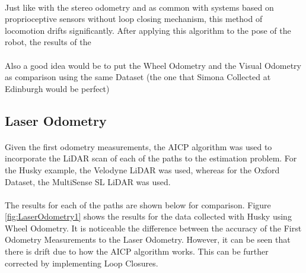 \documentclass[11pt]{article}
\begin{document}
	\paragraph{}
	Just like with the stereo odometry and as common with systems based on proprioceptive sensors without loop closing mechanism, this method of locomotion drifts significantly. After applying this algorithm to the pose of the robot, the results of the 
	\paragraph{}
	Also a good idea would be to put the Wheel Odometry and the Visual Odometry as comparison using the same Dataset (the one that Simona Collected at Edinburgh would be perfect)
		
	\subsection{Laser Odometry}
	\paragraph{}
	Given the first odometry measurements, the AICP algorithm was used to incorporate the LiDAR scan of each of the paths to the estimation problem. For the Husky example, the Velodyne \cite{velodyne} LiDAR was used, whereas for the Oxford Dataset, the MultiSense SL LiDAR was used.
	
	\paragraph{}
	The results for each of the paths are shown below for comparison. Figure \ref{fig:LaserOdometry1} shows the results for the data collected with Husky using Wheel Odometry. It is noticeable the difference between the accuracy of the First Odometry Measurements to the Laser Odometry. However, it can be seen that there is drift due to how the AICP algorithm works. This can be further corrected by implementing Loop Closures.
	
\end{document}
